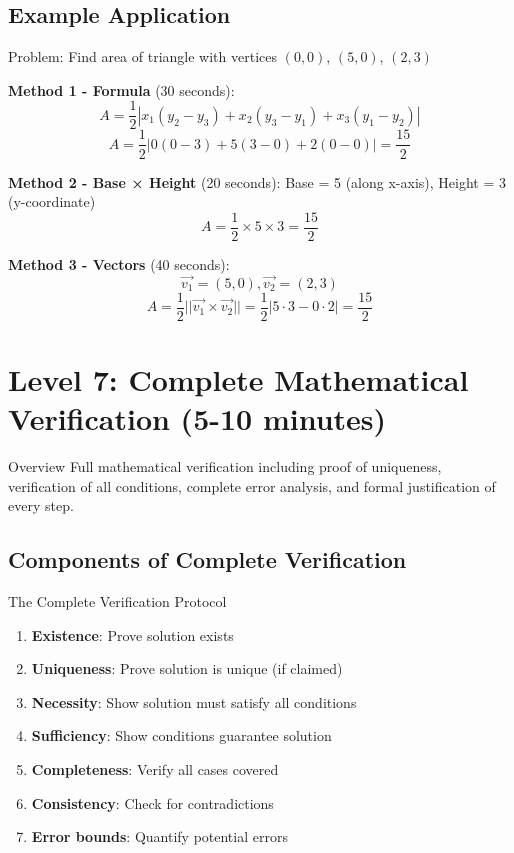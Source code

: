 \documentclass{article}
\begin{document}
\subsection{Example Application}

\begin{multimethodbox}{Problem: Find area of triangle with vertices $(0,0)$, $(5,0)$, $(2,3)$}

\textbf{Method 1 - Formula} (30 seconds):
$$A = \frac{1}{2}|x_1(y_2-y_3) + x_2(y_3-y_1) + x_3(y_1-y_2)|$$
$$A = \frac{1}{2}|0(0-3) + 5(3-0) + 2(0-0)| = \frac{15}{2}$$

\textbf{Method 2 - Base × Height} (20 seconds):
Base = 5 (along x-axis), Height = 3 (y-coordinate)
$$A = \frac{1}{2} \times 5 \times 3 = \frac{15}{2}$$ \checkmark

\textbf{Method 3 - Vectors} (40 seconds):
$$\vec{v_1} = (5,0), \vec{v_2} = (2,3)$$
$$A = \frac{1}{2}||\vec{v_1} \times \vec{v_2}|| = \frac{1}{2}|5 \cdot 3 - 0 \cdot 2| = \frac{15}{2}$$ \checkmark
\end{multimethodbox}

\newpage

\section{Level 7: Complete Mathematical Verification (5-10 minutes)}

\begin{completebox}{Overview}
Full mathematical verification including proof of uniqueness, verification of all conditions, complete error analysis, and formal justification of every step.
\end{completebox}

\subsection{Components of Complete Verification}

\begin{completebox}{The Complete Verification Protocol}
\begin{enumerate}
\item \textbf{Existence}: Prove solution exists
\item \textbf{Uniqueness}: Prove solution is unique (if claimed)
\item \textbf{Necessity}: Show solution must satisfy all conditions
\item \textbf{Sufficiency}: Show conditions guarantee solution
\item \textbf{Completeness}: Verify all cases covered
\item \textbf{Consistency}: Check for contradictions
\item \textbf{Error bounds}: Quantify potential errors
\end{enumerate}
\end{completebox}
\end{document}

